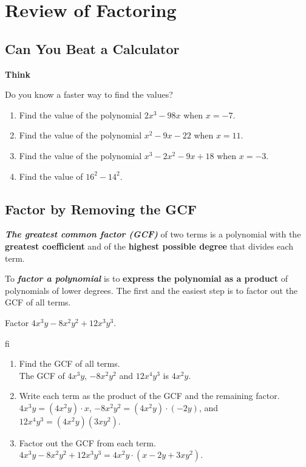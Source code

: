 \documentclass[en,12pt]{elegantbook}
\providecommand{\tightlist}{%
  \setlength{\itemsep}{0pt}\setlength{\parskip}{0pt}}
\newenvironment{rmdthink}{
	\par\noindent
	{
		\makebox[-\width][r]{
			\footnotesize
			\color{green!90}\faLightbulbO
			\hspace*{3pt}
		}
			\textbf{
				\color{second}
				Think 
			}
    }
    \begin{shaded}
    \sffamily
}{
    \par\medskip\ignorespacesafterend
    \end{shaded}
}
\providecommand{\tightlist}{%
  \setlength{\itemsep}{0pt}\setlength{\parskip}{0pt}}
\let\BeginKnitrBlock\begin \let\EndKnitrBlock\end
\begin{document}
\hypertarget{review-of-factoring}{%
\chapter{Review of Factoring}\label{review-of-factoring}}

\hypertarget{can-you-beat-a-calculator}{%
\section{Can You Beat a Calculator}\label{can-you-beat-a-calculator}}

\begin{rmdthink}

Do you know a faster way to find the values?

\begin{enumerate}
\def\labelenumi{\arabic{enumi}.}
\tightlist
\item
  Find the value of the polynomial \(2x^3-98x\) when \(x=-7\).
\item
  Find the value of the polynomial \(x^2-9x-22\) when \(x=11\).
\item
  Find the value of the polynomial \(x^3-2x^2-9x+18\) when \(x=-3\).
\item
  Find the value of \(16^2-14^2\).
\end{enumerate}

\end{rmdthink}

\hypertarget{factor-by-removing-the-gcf}{%
\section{Factor by Removing the GCF}\label{factor-by-removing-the-gcf}}

\textbf{\emph{The greatest common factor (GCF)}} of two terms is a polynomial with the \textbf{greatest coefficient} and of the \textbf{highest possible degree} that divides each term.

To \textbf{\emph{factor a polynomial}} is to \textbf{express the polynomial as a product} of polynomials of lower degrees. The first and the easiest step is to factor out the GCF of all terms.

\BeginKnitrBlock{example}
\protect\hypertarget{exm:unnamed-chunk-8}{}{\label{exm:unnamed-chunk-8} }
Factor \(4x^3y-8x^2y^2+12x^3y^3\).
\EndKnitrBlock{example}

\BeginKnitrBlock{solution}
fi{}~

\begin{enumerate}
\def\labelenumi{\arabic{enumi}.}
\tightlist
\item
  Find the GCF of all terms.\\
  The GCF of \(4x^3y\), \(-8x^2y^2\) and \(12x^4y^3\) is \(4x^2y\).
\item
  Write each term as the product of the GCF and the remaining factor.\\
  \(4x^3y=(4x^2y)\cdot x\), \(-8x^2y^2=(4x^2y)\cdot (-2y)\), and \(12x^4y^3=(4x^2y)(3xy^2)\).
\item
  Factor out the GCF from each term.\\
  \(4x^3y-8x^2y^2+12x^3y^3=4x^2y\cdot(x-2y+3xy^2)\).
\end{enumerate}
\EndKnitrBlock{solution}
\end{document}
